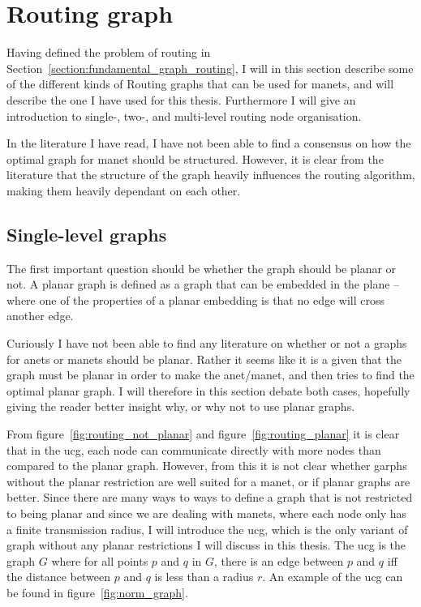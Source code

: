 \section{Routing graph}
\label{section:routing_graph}

Having defined the problem of routing in Section~\ref{section:fundamental_graph_routing}, I will in this section describe some of the different kinds of Routing graphs that can be used for \acp{manet}, and will describe the one I have used for this thesis. Furthermore I will give an introduction to single-, two-, and multi-level routing node organisation. 

In the literature I have read, I have not been able to find a consensus on how the optimal graph for \ac{manet} should be structured. However, it is clear from the literature that the structure of the graph heavily influences the routing algorithm, making them heavily dependant on each other. 

\subsection{Single-level graphs}
\label{single_level}
The first important question should be whether the graph should be planar or not. A planar graph is defined as a graph that can be embedded in the plane -- where one of the properties of a planar embedding is that no edge will cross another edge.

Curiously I have not been able to find any literature on whether or not a graphs for \acp{anet} or \acp{manet} should be planar. Rather it seems like it is a given that the graph must be planar in order to make the \ac{anet}/\ac{manet}, and then tries to find the optimal planar graph. I will therefore in this section debate both cases, hopefully giving the reader better insight why, or why not to use planar graphs.

From figure~\ref{fig:routing_not_planar} and figure~\ref{fig:routing_planar} it is clear that in the \ac{ucg}, each node can communicate directly with more nodes than compared to the planar graph. However, from this it is not clear whether garphs without the planar restriction are well suited for a \ac{manet}, or if planar graphs are better. Since there are many ways to ways to define a graph that is not restricted to being planar and since we are dealing with \acp{manet}, where each node only has a finite transmission radius, I will introduce the \ac{ucg}, which is the only variant of graph without any planar restrictions I will discuss in this thesis. The \ac{ucg} is the graph $G$ where for all points $p$ and $q$ in $G$, there is an edge between $p$ and $q$ iff the distance between $p$ and $q$ is less than a radius $r$. An example of the \ac{ucg} can be found in figure~\ref{fig:norm_graph}. 

